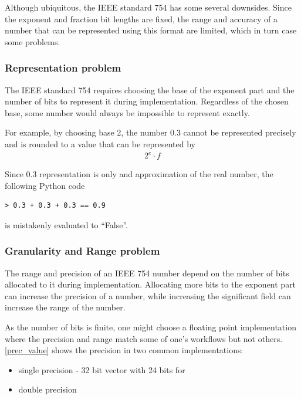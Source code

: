 \documentclass[10pt]{article}
\begin{document}
Although ubiquitous, the IEEE standard 754 has some several downsides. Since the
exponent and fraction bit lengths are fixed, the range and accuracy of a number
that can be represented using this format are limited, which in turn case some
problems.

\subsubsection{Representation problem}\label{sec:accuracyproblem}

The IEEE standard 754 requires choosing the base of the exponent part and the
number of bits to represent it during implementation. Regardless of the chosen
base, some number would always be impossible to represent exactly.

For example, by choosing base 2, the number $0.3$ cannot be represented
precisely and is rounded to a value that can be represented by
\begin{align*}
  {2}^{e}\cdot f
\end{align*}

Since $0.3$ representation is only and approximation of the real number, the
following Python code
\begin{verbatim}
> 0.3 + 0.3 + 0.3 == 0.9
\end{verbatim}
is mistakenly evaluated to ``False''.

\subsubsection{Granularity and Range problem}\label{sec:gran-range-probl}

The range and precision of an IEEE 754 number depend on the number of bits
allocated to it during implementation.
Allocating more bits to the exponent part can increase the precision of a
number, while increasing the significant field can increase the range of the
number.

As the number of bits is finite, one might choose a floating point
implementation where the precision and range match some of one's workflows but
not others. \ref{prec_value} shows the precision in two common implementations:
\begin{itemize}
  \item single precision - 32 bit vector with 24 bits for
  \item double precision
\end{itemize}
\end{document}
